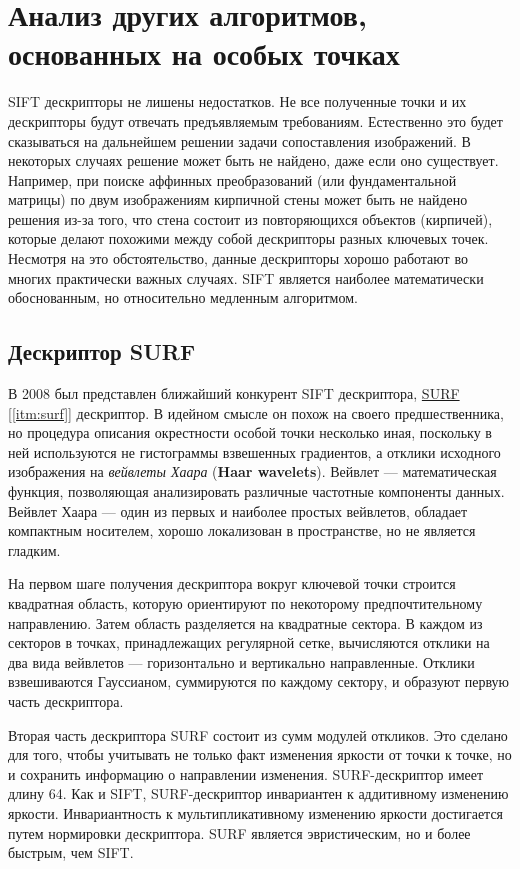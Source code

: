 \section{Анализ других алгоритмов, основанных на особых точках}

SIFT дескрипторы не лишены недостатков. Не все полученные точки и их дескрипторы будут отвечать предъявляемым требованиям. Естественно это будет сказываться на дальнейшем решении задачи сопоставления изображений. В некоторых случаях решение может быть не найдено, даже если оно существует. Например, при поиске аффинных преобразований (или фундаментальной матрицы) по двум изображениям кирпичной стены может быть не найдено решения из-за того, что стена состоит из повторяющихся объектов (кирпичей), которые делают похожими между собой дескрипторы разных ключевых точек. Несмотря на это обстоятельство, данные дескрипторы хорошо работают во многих практически важных случаях. SIFT является наиболее математически обоснованным, но относительно медленным алгоритмом.

\subsection{Дескриптор SURF}

В 2008 был представлен ближайший конкурент SIFT дескриптора, \hyperref[itm:surf]{ SURF [\ref{itm:surf}]} дескриптор. В идейном смысле он похож на своего предшественника, но процедура описания окрестности особой точки несколько иная, поскольку в ней используются не гистограммы взвешенных градиентов, а отклики исходного изображения на \textit{вейвлеты Хаара} (\textbf{Haar wavelets}). Вейвлет — математическая функция, позволяющая анализировать различные частотные компоненты данных. Вейвлет Хаара — один из первых и наиболее простых вейвлетов, обладает компактным носителем, хорошо локализован в пространстве, но не является гладким.

На первом шаге получения дескриптора вокруг ключевой точки строится квадратная область, которую ориентируют по некоторому предпочтительному направлению. Затем область разделяется на квадратные сектора. В каждом из секторов в точках, принадлежащих регулярной сетке, вычисляются отклики на два вида вейвлетов — горизонтально и вертикально направленные. Отклики взвешиваются Гауссианом, суммируются по каждому сектору, и образуют первую часть дескриптора.

Вторая часть дескриптора SURF состоит из сумм модулей откликов. Это сделано для того, чтобы учитывать не только факт изменения яркости от точки к точке, но и сохранить информацию о направлении изменения. SURF-дескриптор имеет длину 64. Как и SIFT, SURF-дескриптор инвариантен к аддитивному изменению яркости. Инвариантность к мультипликативному изменению яркости достигается путем нормировки дескриптора. SURF является эвристическим, но и более быстрым, чем SIFT.

